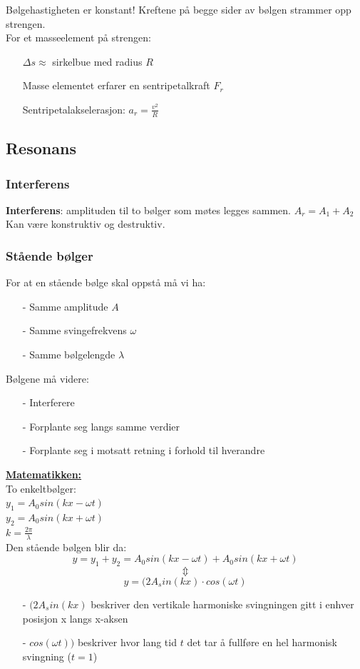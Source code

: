 \documentclass[12pt]{article}
\begin{document}
Bølgehastigheten er konstant! Kreftene på begge sider av bølgen strammer opp strengen.\\
For et masseelement på strengen:
\begin{itemize}
    \item[] $\Delta s \approx$ sirkelbue med radius $R$
    \item[] Masse elementet erfarer en sentripetalkraft $F_r$
    \item[] Sentripetalakselerasjon: $a_r = \frac{v^2}{R}$
\end{itemize}

\subsection{Resonans}
\subsubsection{Interferens}
\textbf{Interferens}: amplituden til to bølger som møtes legges sammen. $A_r = A_1+ A_2$\\
Kan være konstruktiv og destruktiv.\\

\subsubsection{Stående bølger}
For at en stående bølge skal oppstå må vi ha:
\begin{itemize}
    \item[-] Samme amplitude $A$
    \item[-] Samme svingefrekvens $\omega$
    \item[-] Samme bølgelengde $\lambda$
\end{itemize}
Bølgene må videre:
\begin{itemize}
    \item[-] Interferere
    \item[-] Forplante seg langs samme verdier
    \item[-] Forplante seg i motsatt retning i forhold til hverandre
\end{itemize}
\textbf{\underline{Matematikken:}}\\
\bigskip
To enkeltbølger:\\
$y_1 = A_0sin(kx-\omega t)$\\
$y_2 = A_0 sin(kx+\omega t)$\\
$k = \frac{2\pi}{\lambda}$\\
\bigskip
Den stående bølgen blir da:
$$y = y_1+y_2 = A_0sin(kx-\omega t) +  A_0 sin(kx+\omega t)$$
$$\Updownarrow$$
$$y = (2A_sin(kx)\cdot cos(\omega t)$$
\begin{itemize}
    \item [-] $(2A_sin(kx)$ beskriver den vertikale harmoniske svingningen gitt i enhver posisjon x langs x-aksen
    \item [-] $cos(\omega t))$ beskriver hvor lang tid $t$ det tar å fullføre en hel harmonisk svingning ($t=1$)
\end{itemize}
\end{document}
